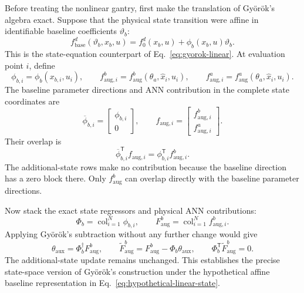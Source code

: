 \documentclass[11pt,a4paper]{article}
\newcommand{\col}{\operatorname{col}}
\newcommand{\T}{\mathsf{T}}
\begin{document}
Before treating the nonlinear gantry, first make the translation of
Gy\"or\"ok's algebra exact.  Suppose that the physical state transition were
affine in identifiable baseline coefficients \(\vartheta_b\):
\begin{equation}
f_{\mathrm{base}}^d(\vartheta_b,x_b,u)
=f_0^d(x_b,u)+\phi_b(x_b,u)\vartheta_b.
\label{eq:hypothetical-linear-state}
\end{equation}
This is the state-equation counterpart of
Eq.~\eqref{eq:gyorok-linear}.  At evaluation point \(i\), define
\begin{equation}
\phi_{b,i}=\phi_b(x_{b,i},u_i),
\qquad
f_{\mathrm{aug},i}^b=f_{\mathrm{aug}}^b(\theta_a,\widehat x_i,u_i),
\qquad
f_{\mathrm{aug},i}^a=f_{\mathrm{aug}}^a(\theta_a,\widehat x_i,u_i).
\end{equation}
The baseline parameter directions and ANN contribution in the complete state
coordinates are
\begin{equation}
\overline\phi_{b,i}
=
\begin{bmatrix}
\phi_{b,i}\\
0
\end{bmatrix},
\qquad
f_{\mathrm{aug},i}
=
\begin{bmatrix}
f_{\mathrm{aug},i}^b\\
f_{\mathrm{aug},i}^a
\end{bmatrix}.
\label{eq:lifted-exact-directions}
\end{equation}
Their overlap is
\begin{equation}
\overline\phi_{b,i}^{\T}f_{\mathrm{aug},i}
=\phi_{b,i}^{\T}f_{\mathrm{aug},i}^b.
\label{eq:zero-block}
\end{equation}
The additional-state rows make no contribution because the baseline direction
has a zero block there.  Only \(f_{\mathrm{aug}}^b\) can overlap directly with
the baseline parameter directions.

Now stack the exact state regressors and physical ANN contributions:
\begin{equation}
\Phi_b=\col_{i=1}^{N}\phi_{b,i},
\qquad
F_{\mathrm{aug}}^b=\col_{i=1}^{N}f_{\mathrm{aug},i}^b.
\end{equation}
Applying Gy\"or\"ok's subtraction without any further change would give
\begin{equation}
\theta_{\mathrm{aux}}=\Phi_b^\dagger F_{\mathrm{aug}}^b,
\qquad
\widetilde F_{\mathrm{aug}}^b
=F_{\mathrm{aug}}^b-\Phi_b\theta_{\mathrm{aux}},
\qquad
\boxed{\Phi_b^\T\widetilde F_{\mathrm{aug}}^b=0.}
\label{eq:exact-state-obc}
\end{equation}
The additional-state update remains unchanged.  This establishes the precise
state-space version of Gy\"or\"ok's construction under the hypothetical affine
baseline representation in Eq.~\eqref{eq:hypothetical-linear-state}.
\end{document}
